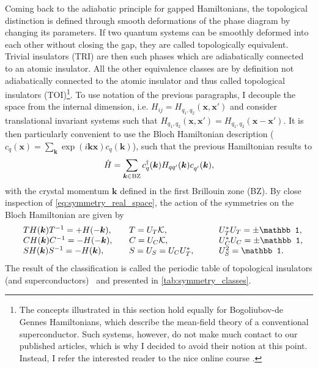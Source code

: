 Coming back to the adiabatic principle for gapped Hamiltonians, the topological distinction is defined through smooth deformations of the phase diagram by changing its parameters.
If two quantum systems can be smoothly deformed into each other without closing the gap, they are called topologically equivalent.
Trivial insulators (TRI) are then such phases which are adiabatically connected to an atomic insulator.
All the other equivalence classes are by definition not adiabatically connected to the atomic insulator and thus called topological insulators (TOI)\footnote{The concepts illustrated in this section hold equally for Bogoliubov-de Gennes Hamiltonians, which describe the mean-field theory of a conventional superconductor. Such systems, however, do not make much contact to our published articles, which is why I decided to avoid their notion at this point. Instead, I refer the interested reader to the nice online course \cite{topocondmat}.}.
To use notation of the previous paragraphs, I decouple the space from the internal dimension, i.e. $H_{ij}=H_{q_1,q_2}(\bm x,\bm x')$ and consider translational invariant systems such that $H_{q_1,q_2}(\bm x,\bm x')=H_{q_1,q_2}(\bm x-\bm x')$.
It is then particularly convenient to use the Bloch Hamiltonian description ($c_q(\bm x)=\sum_{\bm k}\exp(i\bm k\bm x)c_q(\bm k)$), such that the previous Hamiltonian results to
\begin{align}
    \hat H = \sum_{\bm k\in {\rm BZ}} c^\dag_q(\bm k) H_{qq'}(\bm k)c^\pdag_{q'}(\bm k),
\end{align}
with the crystal momentum $\bm k$ defined in the first Brillouin zone (BZ).
By close inspection of \cref{eq:symmetry_real_space}, the action of the symmetries on the Bloch Hamiltonian are given by
\begin{align}
    \begin{array}{l l l l }
        & TH(\bm k)T^{-1} = +H(-\bm k)
        ,\quad
        & T = U_T\mathcal K
        ,\quad
        & U_T^*U_T = \pm\mathbb1,\\
        & CH(\bm k)C^{-1} = -H(-\bm k)
        ,\quad
        & C = U_C\mathcal K
        ,\quad
        & U_C^*U_C = \pm\mathbb1,\\
        & SH(\bm k)S^{-1} = -H(\bm k)
        ,\quad
        & S = U_S = U_C U^*_T
        ,\qquad
        & U_S^2 = \mathbb1.
    \end{array}
    \label{eq:symmetry_momentum_space}
\end{align}
The result of the classification is called the periodic table of topological insulators (and superconductors)~\cite{Kitaev2009,Qi2008,Ryu2010,Schnyder2008} and presented in \cref{tab:symmetry_classes}.

